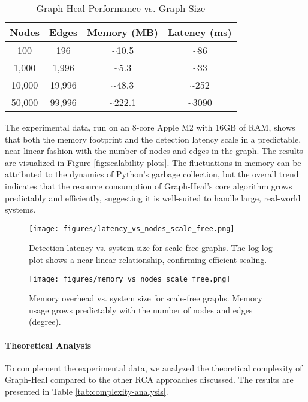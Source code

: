 \documentclass[11pt,conference]{IEEEtran}
\begin{document}
\begin{table}[h!]
\centering
\caption{Graph-Heal Performance vs. Graph Size}
\label{tab:scalability-results}
\begin{tabular}{|c|c|c|c|}
\hline
\textbf{Nodes} & \textbf{Edges} & \textbf{Memory (MB)} & \textbf{Latency (ms)} \\
\hline
100 & 196 & \textasciitilde{}10.5 & \textasciitilde{}86 \\
\hline
1,000 & 1,996 & \textasciitilde{}5.3 & \textasciitilde{}33 \\
\hline
10,000 & 19,996 & \textasciitilde{}48.3 & \textasciitilde{}252 \\
\hline
50,000 & 99,996 & \textasciitilde{}222.1 & \textasciitilde{}3090 \\
\hline
\end{tabular}
\end{table}

The experimental data, run on an 8-core Apple M2 with 16GB of RAM, shows that both the memory footprint and the detection latency scale in a predictable, near-linear fashion with the number of nodes and edges in the graph. The results are visualized in Figure \ref{fig:scalability-plots}. The fluctuations in memory can be attributed to the dynamics of Python's garbage collection, but the overall trend indicates that the resource consumption of Graph-Heal's core algorithm grows predictably and efficiently, suggesting it is well-suited to handle large, real-world systems.

\begin{figure}[h!]
    \centering
    \texttt{[image: figures/latency\_vs\_nodes\_scale\_free.png]}
    \caption{Detection latency vs. system size for scale-free graphs. The log-log plot shows a near-linear relationship, confirming efficient scaling.}
    \label{fig:latency-plot}
\end{figure}

\begin{figure}[h!]
    \centering
    \texttt{[image: figures/memory\_vs\_nodes\_scale\_free.png]}
    \caption{Memory overhead vs. system size for scale-free graphs. Memory usage grows predictably with the number of nodes and edges (degree).}
    \label{fig:memory-plot}
\end{figure}

\paragraph{Theoretical Analysis}
To complement the experimental data, we analyzed the theoretical complexity of Graph-Heal compared to the other RCA approaches discussed. The results are presented in Table \ref{tab:complexity-analysis}.
\end{document}
